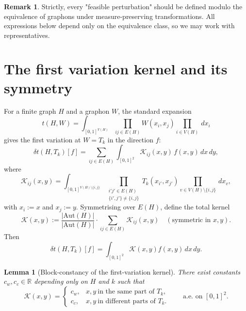 \documentclass[11pt]{amsart}
\newtheorem{lemma}[theorem]{Lemma}
\theoremstyle{definition}
\newtheorem{remark}[theorem]{Remark}
\newcommand{\1}{\mathbf 1}
\newcommand{\R}{\mathbb R}
\newcommand{\dd}{\,d}
\begin{document}
\begin{remark}
Strictly, every "feasible perturbation" should be defined modulo
the equivalence of graphons under measure-preserving transformations.  All
expressions below depend only on the equivalence class, so we may work with
representatives.
\end{remark}

\section{The first variation kernel and its symmetry}

For a finite graph $H$ and a graphon $W$, the standard expansion
\[
   t(H,W) = \int_{[0,1]^{V(H)}}\prod_{ij\in E(H)} W(x_i,x_j)\prod_{i\in V(H)} \dd x_i
\]
gives the first variation at $W=T_k$ in the direction $f$:
\begin{equation}
\label{eq:first-variation}
   \delta t(H,T_k)[f]
   = \sum_{ij\in E(H)}
     \int_{[0,1]^2} \mathcal K_{ij}(x,y)\, f(x,y) \dd x\dd y,
\end{equation}
where
\[
   \mathcal K_{ij}(x,y)
   = \int_{[0,1]^{V(H)\setminus\{i,j\}}}
       \prod_{\substack{i'j'\in E(H) \\ \{i',j'\}\ne\{i,j\}}} T_k(x_{i'},x_{j'})
       \prod_{v\in V(H)\setminus\{i,j\}} \dd x_v,
\]
with $x_i:=x$ and $x_j:=y$.  Symmetrising over $E(H)$, define the total kernel
\begin{equation}
\label{eq:total-kernel}
   \mathcal K(x,y) := \frac{|\mathrm{Aut}(H)|}{|\mathrm{Aut}(H)|}\cdot
   \sum_{ij\in E(H)} \mathcal K_{ij}(x,y)
   \quad (\text{symmetric in }x,y).
\end{equation}
Then
\[
   \delta t(H,T_k)[f] = \int_{[0,1]^2} \mathcal K(x,y) f(x,y) \dd x\dd y.
\]

\begin{lemma}[Block-constancy of the first-variation kernel]
\label{lem:K-block-constant}
There exist constants $c_w, c_c\in\R$ depending only on $H$ and $k$ such that
\[
   \mathcal K(x,y) =
   \begin{cases}
      c_w, & x,y\ \text{in the same part of }T_k,\\
      c_c, & x,y\ \text{in different parts of }T_k.
   \end{cases}
   \qquad\text{a.e.\ on }[0,1]^2.
\]
\end{lemma}
\end{document}
